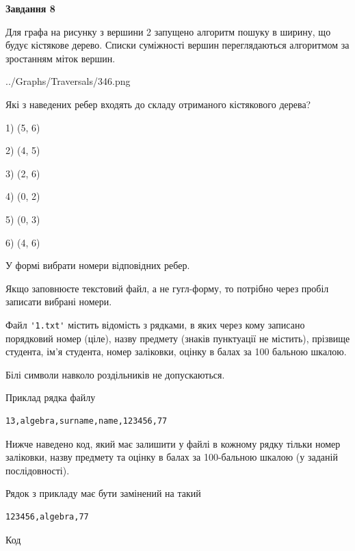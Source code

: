 \documentclass[12pt, ukrainian]{article}
\def\code#1{\Verb!#1!}
\begin{document}
{\begin {large}
{\begin {center}\textbf{Завдання 8}\end {center}}\par
Для графа на рисунку з вершини 2 запущено алгоритм пошуку в ширину, що будує кістякове дерево. Списки суміжності вершин переглядаються алгоритмом за зростанням міток вершин.\par
\begin{center}
	{../Graphs/Traversals/346.png}
\end{center}
\par Які з наведених ребер входять до складу отриманого кістякового дерева?\par
1) (5, 6)\par
2) (4, 5)\par
3) (2, 6)\par
4) (0, 2)\par
5) (0, 3)\par
6) (4, 6)\par
{\vskip 15pt} У формі вибрати номери відповідних ребер.


Якщо заповнюєте текстовий файл, а не гугл-форму, то потрібно через пробіл записа\-ти вибрані номери.\par
\newpage


Файл \code{'1.txt'} містить відомість з рядками, в яких через кому записа\-но поряд\-ковий номер (ціле), назву предмету (знаків пунктуації не містить), прізвище студента, ім'я студента, номер заліковки, оцінку в балах за 100 бальною шкалою.

Білі символи навколо роздільників не допускаються.

Приклад рядка файлу



\begin{verbatim}
13,algebra,surname,name,123456,77
\end{verbatim}


Нижче наведено код, який має залишити у файлі в кожному рядку тільки номер заліковки, назву предмету та оцінку в балах за 100-бальною шкалою (у заданій послі\-дов\-ності).

Рядок з прикладу має бути замінений на такий



\begin{verbatim}
123456,algebra,77
\end{verbatim}




Код




\end{large}}
\end{document}
